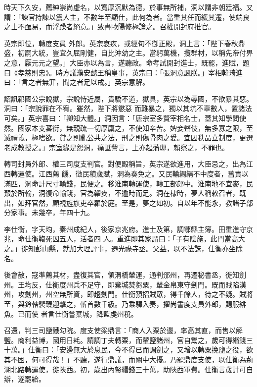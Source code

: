 \begin{pinyinscope}
 時天下久安，薦紳崇尚虛名，以寬厚沉默為德，於事無所補，洞以謂非朝廷福。又謂：「諫官持諫以震人主，不數年至顯仕，此何為者。當重其任而緩其遷，使端良之士不亟易，而浮躁者絕意。」致書歐陽修極論之。召權開封府推官。



 英宗即位，轉度支員
 外郎。英宗哀疚，或經旬不御正殿，洞上言：「陛下春秋鼎盛，初嗣大統，豈宜久屈剛健，自比沖幼之主。當躬萬機，攬群材，以稱先帝付畀之意，厭元元之望。」大臣亦以為言，遂聽政。命考試開封進士，既罷，進賦，題曰《孝慈則忠》。時方議濮安懿王稱皇事，英宗曰：「張洞意諷朕。」宰相韓琦進曰：「言之者無罪，聞之者足以戒。」英宗意解。



 詔訊祁國公宗說獄，宗說恃近屬，貴驕不道，獄具，英宗以為辱國，不欲暴其惡。洞曰：「宗說罪在不宥。雖然，陛下將懲惡
 而難暴之，獨以其坑不辜數人，置諸法可矣。」英宗喜曰：「卿知大體。」洞因言：「唐宗室多賢宰相名士，蓋其知學問使然。國家本支蕃衍，無親疏一切厚廩之，不使知辛苦。婢妾聲伎，無多寡之限，至滅禮義，極嗜欲。貸之則亂公共之法，刑之則傷骨肉之愛。宜因秩品立制度，更選老成教授之。」宗室緣是怨洞，痛詆訾言，上亦起藩邸，賴察之，不罪也。



 轉司封員外郎、權三司度支判官。對便殿稱旨，英宗遂欲進用，大臣忌之，出為江西轉運使。江西薦
 饑，徵民積歲賦，洞為奏免之。又民輸綢絹不中度者，舊責以滿匹，洞命計尺寸輸錢，民便之。移淮南轉運使，轉工部郎中。淮南地不宜麥，民艱於所輸，洞復命輸錢，官為糴麥，不逾時而足。洞在棣時，夢人稱敕召者，既出，如拜官然，顧視旌旗吏卒羅於庭。至是，夢之如初。自以年不能永，教諸子部分家事。未幾卒，年四十九。



 李仕衡，字天均，秦州成紀人，後家京兆府。進士及第，調鄠縣主簿。田重進守京兆，命仕衡鞫死囚五人，活者四
 人。重進即其家謂曰：「子有陰施，此門當高大之。」徙知彭山縣，就加大理評事，遷光祿寺丞。父益，以不法誅，仕衡亦坐除名。



 後會赦，寇準薦其材，盡復其官，領渭橋輦運，通判邠州，再遷秘書丞，徙知劍州。王均反，仕衡度州兵不足守，即棄城焚芻粟，輦金帛東守劍門。既而賊陷漢州，攻劍州，州空無所資，即趨劍門。仕衡預招賊眾，得千餘人，待之不疑。賊將至，與鈐轄裴臻迎擊之，斬首數千級。乃乘驛入奏，擢尚書度支員外郎，賜服緋魚。已而使
 者言仕衡嘗棄城，降監虔州稅。



 召還，判三司鹽鐵勾院。度支使梁鼎言：「商人入粟於邊，率高其直，而售以解鹽。商利益博，國用日耗。請調丁夫轉粟，而輦鹽諸州，官自鬻之，歲可得緡錢三十萬。」仕衡曰：「安邊無大於息民，今不得已而調劍之，又增以轉粟挽鹽之役，欲其不困，何可得哉！」不聽，遂行鼎議，而關中大擾。乃罷鼎度支使，以仕衡為荊湖北路轉運使，徙陜西。初，歲出內帑緡錢三十萬，助陜西軍費。仕衡言歲計可自辦，遂罷給。




\end{pinyinscope}
